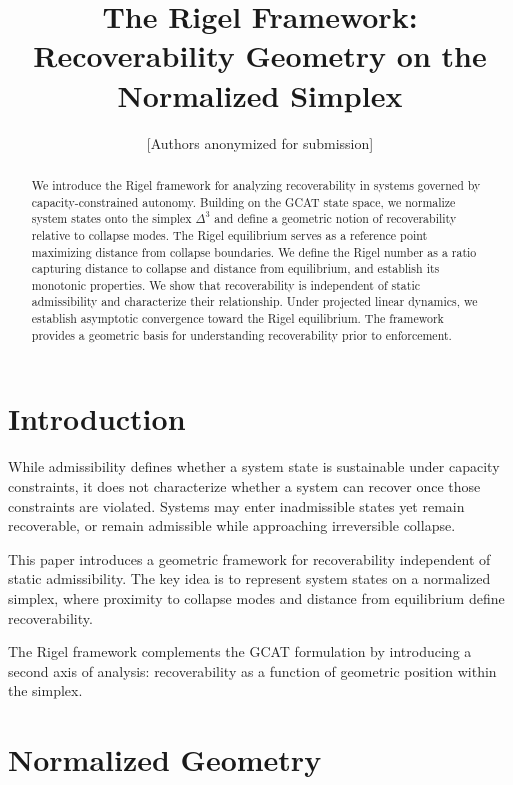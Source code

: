 \documentclass[letterpaper, 10 pt, conference]{ieeeconf}
\title{\bf The Rigel Framework: Recoverability Geometry on the Normalized Simplex}
\author{[Authors anonymized for submission]}
\begin{document}
\maketitle
\thispagestyle{empty}
\pagestyle{empty}

\begin{abstract}
We introduce the Rigel framework for analyzing recoverability in systems governed by capacity-constrained autonomy. Building on the GCAT state space, we normalize system states onto the simplex $\Delta^3$ and define a geometric notion of recoverability relative to collapse modes. The Rigel equilibrium serves as a reference point maximizing distance from collapse boundaries. We define the Rigel number as a ratio capturing distance to collapse and distance from equilibrium, and establish its monotonic properties. We show that recoverability is independent of static admissibility and characterize their relationship. Under projected linear dynamics, we establish asymptotic convergence toward the Rigel equilibrium. The framework provides a geometric basis for understanding recoverability prior to enforcement.
\end{abstract}

\section{Introduction}

While admissibility defines whether a system state is sustainable under capacity constraints, it does not characterize whether a system can recover once those constraints are violated. Systems may enter inadmissible states yet remain recoverable, or remain admissible while approaching irreversible collapse.

This paper introduces a geometric framework for recoverability independent of static admissibility. The key idea is to represent system states on a normalized simplex, where proximity to collapse modes and distance from equilibrium define recoverability.

The Rigel framework complements the GCAT formulation by introducing a second axis of analysis: recoverability as a function of geometric position within the simplex.

\section{Normalized Geometry}
\end{document}
